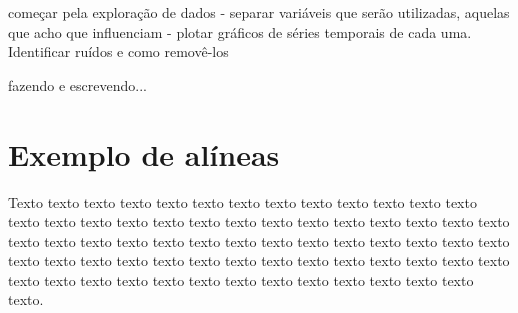   	\begin{figure}[h!] 
   	    \captionsetup{width=12cm}%
	\end{figure}


 começar pela exploração de dados
- separar variáveis que serão utilizadas, aquelas que acho que influenciam
- plotar gráficos de séries temporais de cada uma. Identificar ruídos e como removê-los

fazendo e escrevendo...
 

\section{Exemplo de alíneas}\label{sec:exemplo-de-algoritmos-e-figuras}

    Texto texto texto texto texto texto texto texto texto texto texto texto texto texto texto texto texto texto texto texto texto texto texto texto texto texto texto texto texto texto texto texto texto texto texto texto texto texto texto texto texto texto texto texto texto texto texto texto texto texto texto texto texto texto texto texto texto texto texto texto texto texto texto texto texto texto texto texto texto.


